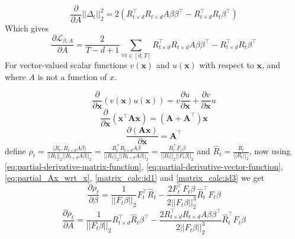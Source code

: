 \begin{equation}
    \frac{\partial}{\partial A} ||\Delta_t||_2^2 = 2(R_{t\times d}^\top R_{t\times d} A \beta \beta^\top - R_{t\times d}^\top R_t \beta^\top)
\end{equation}
\newline Which gives
\begin{equation}
    \frac{\partial \mathcal{L}_{\beta, A}}{\partial A} = \frac{2}{T-d+1} \sum_{\forall t\in [d,T]} R_{t\times d}^\top R_{t\times d} A \beta \beta^\top - R_{t\times d}^\top R_t \beta^\top
\end{equation}
\newline For vector-valued scalar functions $v(\mathbf{x})$ and $u(\mathbf{x})$ with respect to $\mathbf{x}$, and where $A$ is not a function of $x$.

\begin{equation}\label{eq:partial-derivative-vector-function}
\frac{\partial}{\partial \mathbf{x}} \left( v(\mathbf{x}) u(\mathbf{x}) \right) =  v \frac{\partial u}{\partial \mathbf{x}} + \frac{\partial v}{\partial \mathbf{x}} u
\end{equation}
\begin{equation}\label{eq:partial-derivative-matrix-function}
\frac{\partial}{\partial \mathbf{x}} (\mathbf{x}^{\top} \mathbf{A} \mathbf{x}) = (\mathbf{A} + \mathbf{A}^{\top}) \mathbf{x}
\end{equation}
\begin{equation}
\frac{\partial (\mathbf{Ax})}{\partial \mathbf{x}} = \mathbf{A}^\top \label{eq:partial_Ax_wrt_x}
\end{equation}
\newline define $\rho_t = \frac{\langle R_t,R_{t\times d} A  \beta\rangle}{||R_t||_2||R_{t\times d} A \beta||_2} = \frac{ R_t^\top R_{t\times d} A  \beta}{||R_t||_2||R_{t\times d} A \beta||_2} = \frac{ R_t^\top F_t \beta}{||R_t||_2||F_{t} \beta||_2}$ and $\hat{R}_t=\frac{R_t}{||R_t||_2}$, now using \ref{eq:partial-derivative-matrix-function}, \ref{eq:partial-derivative-vector-function}, \ref{eq:partial_Ax_wrt_x}, \ref{matrix_calc:id1} and \ref{matrix_calc:id3} we get
\begin{equation} \label{eq:derivative-rho_t_beta}
    \frac{\partial \rho_t}{\partial \beta} =  \frac{1}{||F_t\beta||_2}F_t^\top \hat{R}_t - \frac{2F_t^\top F_t \beta}{2||F_t\beta||_2^3}\hat{R}_t^\top F_t \beta
\end{equation}
\begin{equation} \label{eq:derivative-rho_t_A}
    \frac{\partial \rho_t}{\partial A} =  \frac{1}{||F_t\beta||_2} R_{t\times d}^\top \hat{R}_t \beta^\top - \frac{2R_{t\times d}^\top R_{t\times d} A \beta \beta^\top }{2||F_t\beta||_2^3}\hat{R}_t^\top F_t \beta
\end{equation}
